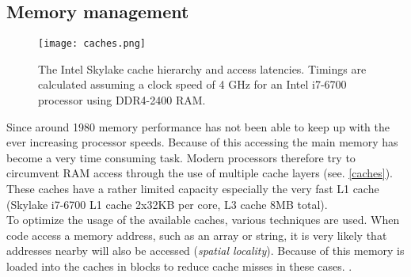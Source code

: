 \documentclass[conference,compsoc,final,a4paper]{IEEEtran}
\begin{document}
\subsection{Memory management}
\begin{figure}[!ht]
\centering
\texttt{[image: caches.png]}
\caption{The Intel Skylake cache hierarchy and access latencies\cite{fog2012microarchitecture}. Timings are calculated assuming a clock speed of 4 GHz for an Intel i7-6700 processor using DDR4-2400 RAM\cite{skylakeBenchmark}. }
\label{caches}
\end{figure}
Since around 1980 memory performance has not been able to keep up with the ever increasing processor speeds. \cite[p.~73]{hennessy2011computer} Because of this accessing the main memory has become a very time consuming task. Modern processors therefore try to circumvent RAM access through the use of multiple cache layers (see. \autoref{caches}). These caches have a rather limited capacity especially the very fast L1 cache (Skylake i7-6700 L1 cache 2x32KB per core, L3 cache 8MB total). \cite{skylakeBenchmark} \\
To optimize the usage of the available caches, various techniques are used. When code access a memory address, such as an array or string, it is very likely that addresses nearby will also be accessed (\emph{spatial locality}). Because of this memory is loaded into the caches in blocks to reduce cache misses in these cases. \cite[p.~74]{hennessy2011computer}. \\
\end{document}
